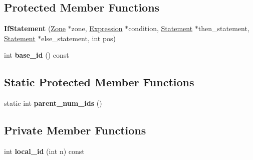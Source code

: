 \subsection*{Protected Member Functions}
\begin{DoxyCompactItemize}
\item 
{\bfseries If\+Statement} (\hyperlink{classv8_1_1internal_1_1_zone}{Zone} $\ast$zone, \hyperlink{classv8_1_1internal_1_1_expression}{Expression} $\ast$condition, \hyperlink{classv8_1_1internal_1_1_statement}{Statement} $\ast$then\+\_\+statement, \hyperlink{classv8_1_1internal_1_1_statement}{Statement} $\ast$else\+\_\+statement, int pos)\hypertarget{classv8_1_1internal_1_1_if_statement_a052515b67ddfb73cfc4c53a880300001}{}\label{classv8_1_1internal_1_1_if_statement_a052515b67ddfb73cfc4c53a880300001}

\item 
int {\bfseries base\+\_\+id} () const \hypertarget{classv8_1_1internal_1_1_if_statement_a4e4e83646e91e173ef0ec18222765470}{}\label{classv8_1_1internal_1_1_if_statement_a4e4e83646e91e173ef0ec18222765470}

\end{DoxyCompactItemize}
\subsection*{Static Protected Member Functions}
\begin{DoxyCompactItemize}
\item 
static int {\bfseries parent\+\_\+num\+\_\+ids} ()\hypertarget{classv8_1_1internal_1_1_if_statement_a5bd7e3fdebe696fb0f18ae874721c5ac}{}\label{classv8_1_1internal_1_1_if_statement_a5bd7e3fdebe696fb0f18ae874721c5ac}

\end{DoxyCompactItemize}
\subsection*{Private Member Functions}
\begin{DoxyCompactItemize}
\item 
int {\bfseries local\+\_\+id} (int n) const \hypertarget{classv8_1_1internal_1_1_if_statement_aa37ae622a9c648b90916ff4459d10a79}{}\label{classv8_1_1internal_1_1_if_statement_aa37ae622a9c648b90916ff4459d10a79}

\end{DoxyCompactItemize}
